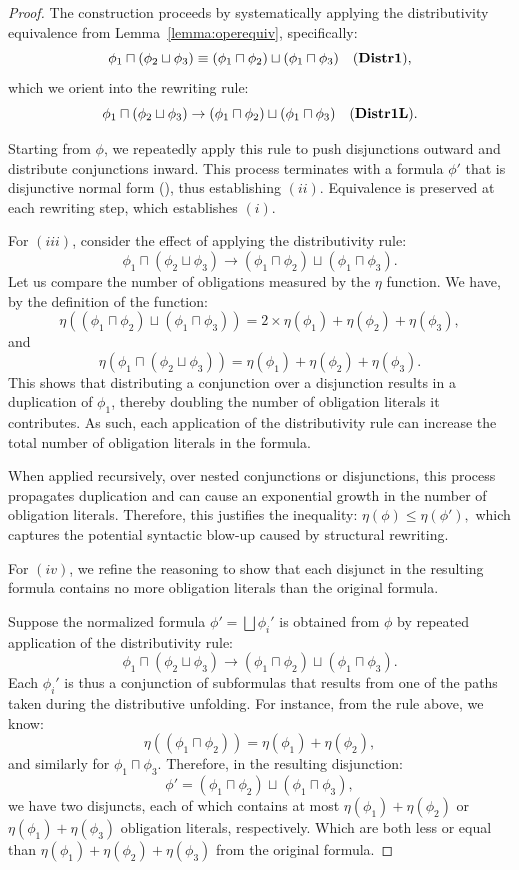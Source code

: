 \begin{proof}
The construction proceeds by systematically applying the distributivity equivalence from Lemma~\ref{lemma:operequiv}, specifically:
\[
\phi_1 \sqcap (\phi_2 \sqcup \phi_3) \equiv  (\phi_1 \sqcap \phi_2) \sqcup (\phi_1 \sqcap \phi_3) \quad \text{(\textbf{Distr1})},
\]
which we orient into the rewriting rule:
\[
\phi_1 \sqcap (\phi_2 \sqcup \phi_3) \to (\phi_1 \sqcap \phi_2) \sqcup (\phi_1 \sqcap \phi_3)\quad \text{(\textbf{Distr1L})}.
\]

Starting from \(\phi\), we repeatedly apply this rule to push disjunctions outward and distribute conjunctions inward. This process terminates with a formula \(\phi'\) that is disjunctive normal form (\dnf), thus establishing $(ii)$. Equivalence is preserved at each rewriting step, which establishes $(i)$.

For $(iii)$, consider the effect of applying the distributivity rule:
\[
\phi_1 \sqcap (\phi_2 \sqcup \phi_3) \to (\phi_1 \sqcap \phi_2) \sqcup (\phi_1 \sqcap \phi_3).
\]
Let us compare the number of obligations measured by the $\eta$ function. We have, by the definition of the function: 
\[
 \eta((\phi_1 \sqcap \phi_2) \sqcup (\phi_1 \sqcap \phi_3))= 2\times \eta(\phi_1) + \eta(\phi_2) + \eta(\phi_3),
\]
and  \[\eta(\phi_1 \sqcap (\phi_2 \sqcup \phi_3))= \eta(\phi_1) + \eta (\phi_2)  + \eta (\phi_3).\]
This shows that distributing a conjunction over a disjunction results in a duplication of $\phi_1$, thereby doubling the number of obligation literals it contributes. As such, each application of the distributivity rule can increase the total number of obligation literals in the formula. 

When applied recursively,  over nested conjunctions or disjunctions, this process propagates duplication and can cause an exponential growth in the number of obligation literals. Therefore, this justifies the inequality:
$\eta(\phi) \leq \eta(\phi'),$
which captures the potential syntactic blow-up caused by structural rewriting.


For $(iv)$, we refine the reasoning to show that each disjunct in the resulting formula contains no more obligation literals than the original formula.

Suppose the normalized formula $\phi' = \bigsqcup \phi_i'$ is obtained from $\phi$ by repeated application of the distributivity rule:
\[
\phi_1 \sqcap (\phi_2 \sqcup \phi_3) \to (\phi_1 \sqcap \phi_2) \sqcup (\phi_1 \sqcap \phi_3).
\]
Each $\phi_i'$ is thus a conjunction of subformulas that results from one of the paths taken during the distributive unfolding. For instance, from the rule above, we know:
\[
\eta((\phi_1 \sqcap \phi_2)) = \eta(\phi_1) + \eta(\phi_2),
\]
and similarly for $\phi_1 \sqcap \phi_3$. Therefore, in the resulting disjunction:
\[
\phi' = (\phi_1 \sqcap \phi_2) \sqcup (\phi_1 \sqcap \phi_3),
\]
we have two disjuncts, each of which contains at most $\eta(\phi_1) + \eta(\phi_2)$ or $\eta(\phi_1) + \eta(\phi_3)$ obligation literals, respectively. Which are both less or equal than $\eta(\phi_1) +\eta(\phi_2)+ \eta(\phi_3)$ from the original formula.


\end{proof}
